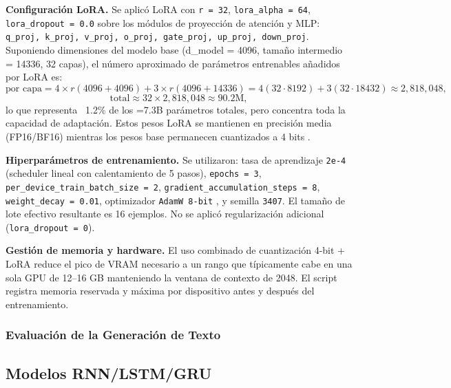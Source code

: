\documentclass[paper=letter, fontsize=11pt, draft=false]{scrartcl}
\numberwithin{equation}{section} %
\numberwithin{figure}{section} %
\numberwithin{table}{section} %
\numberwithin{subsection}{section}
\begin{document}
\textbf{Configuración LoRA.} Se aplicó LoRA con \texttt{r = 32}, \texttt{lora\_alpha = 64}, \texttt{lora\_dropout = 0.0} sobre los módulos de proyección de atención y MLP: \texttt{q\_proj, k\_proj, v\_proj, o\_proj, gate\_proj, up\_proj, down\_proj}. Suponiendo dimensiones del modelo base (d\_model = 4096, tamaño intermedio = 14336, 32 capas), el número aproximado de parámetros entrenables añadidos por LoRA es:
\[
\text{por capa} = 4 \times r (4096 + 4096) + 3 \times r (4096 + 14336) = 4(32 \cdot 8192) + 3(32 \cdot 18432) \approx 2{,}818{,}048,
\]
\[
\text{total} \approx 32 \times 2{,}818{,}048 \approx 90.2\text{M},
\]
lo que representa ~1.2\% de los =7.3B parámetros totales, pero concentra toda la capacidad de adaptación. Estos pesos LoRA se mantienen en precisión media (FP16/BF16) mientras los pesos base permanecen cuantizados a 4 bits \cite{dettmers2023qloraefficientfinetuningquantized}.

\textbf{Hiperparámetros de entrenamiento.} Se utilizaron: tasa de aprendizaje \texttt{2e-4} (scheduler lineal con calentamiento de 5 pasos), \texttt{epochs = 3}, \texttt{per\_device\_train\_batch\_size = 2}, \texttt{gradient\_accumulation\_steps = 8}, \texttt{weight\_decay = 0.01}, optimizador \texttt{AdamW 8-bit} \cite{dettmers2022optimizers}, y semilla \texttt{3407}. El tamaño de lote efectivo resultante es 16 ejemplos. No se aplicó regularización adicional (\texttt{lora\_dropout = 0}).

\textbf{Gestión de memoria y hardware.} El uso combinado de cuantización 4-bit + LoRA reduce el pico de VRAM necesario a un rango que típicamente cabe en una sola GPU de 12–16 GB manteniendo la ventana de contexto de 2048. El script registra memoria reservada y máxima por dispositivo antes y después del entrenamiento.

\subsubsection{Evaluación de la Generación de Texto}



\subsection{Modelos RNN/LSTM/GRU}



\newpage
\end{document}
